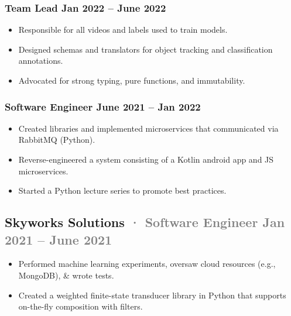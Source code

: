 \documentclass[12pt]{article} %
\providecommand{\tightlist}{%
  \setlength{\itemsep}{0pt}\setlength{\parskip}{0pt}}
\renewcommand{\emph}[1]{%
  \textcolor{gray}{#1}%
}
\begin{document}
\begin{paracol}{2}
\begin{raggedright}
\vspace{-5pt}

\hypertarget{team-lead-jan-2022-june-2022}{%
\subsubsection{\texorpdfstring{\small Team Lead \hfill Jan 2022 -- June
2022}{Team Lead Jan 2022 -- June 2022}}\label{team-lead-jan-2022-june-2022}}

\begin{itemize}
\tightlist
\item
  Responsible for all videos and labels used to train models.
\item
  Designed schemas and translators for object tracking and
  classification annotations.
\item
  Advocated for strong typing, pure functions, and immutability.
\end{itemize}

\hypertarget{software-engineer-june-2021-jan-2022}{%
\subsubsection{\texorpdfstring{\small Software Engineer \hfill June 2021
-- Jan
2022}{Software Engineer June 2021 -- Jan 2022}}\label{software-engineer-june-2021-jan-2022}}

\begin{itemize}
\tightlist
\item
  Created libraries and implemented microservices that communicated via
  RabbitMQ (Python).
\item
  Reverse-engineered a system consisting of a Kotlin android app and JS
  microservices.
\item
  Started a Python lecture series to promote best practices.
\end{itemize}

\hypertarget{skyworks-solutions-software-engineer-jan-2021-june-2021}{%
\subsection{\texorpdfstring{Skyworks Solutions \emph{· \small Software
Engineer \hfill Jan 2021 -- June
2021}}{Skyworks Solutions · Software Engineer Jan 2021 -- June 2021}}\label{skyworks-solutions-software-engineer-jan-2021-june-2021}}

\begin{itemize}
\tightlist
\item
  Performed machine learning experiments, oversaw cloud resources (e.g.,
  MongoDB), \& wrote tests.
\item
  Created a weighted finite-state transducer library in Python that
  supports on-the-fly composition with filters.
\end{itemize}


\end{raggedright}
\end{paracol}
\end{document}
